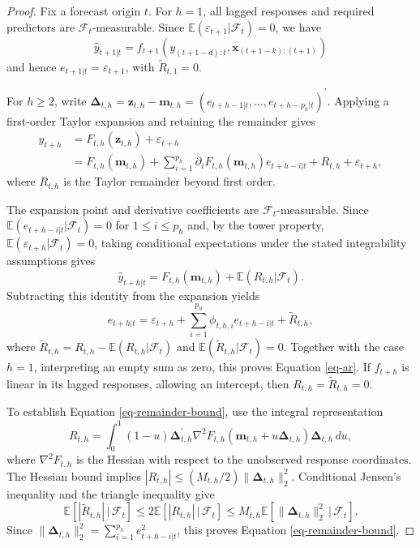 \documentclass[
  american,
  12pt]{article}
\theoremstyle{plain}
\theoremstyle{plain}
\theoremstyle{remark}
\begin{document}
\begin{proof}
Fix a forecast origin \(t\). For \(h=1\), all lagged responses and
required predictors are \(\mathcal F_t\)-measurable. Since
\(\mathbb E(\varepsilon_{t+1}|\mathcal F_t)=0\), we have \[
\hat y_{t+1|t}=f_{t+1}(y_{(t+1-d):t},\bm x_{(t+1-k):(t+1)})
\] and hence \(e_{t+1|t}=\varepsilon_{t+1}\), with
\(\widetilde R_{t,1}=0\).

For \(h\geq2\), write
\(\bm\Delta_{t,h}=\bm z_{t,h}-\bm m_{t,h}=(e_{t+h-1|t},\dots,e_{t+h-p_h|t})^{\prime}\).
Applying a first-order Taylor expansion and retaining the remainder
gives \begin{align*}
y_{t+h}
&=F_{t,h}(\bm z_{t,h})+\varepsilon_{t+h}\\
&=F_{t,h}(\bm m_{t,h})
+\sum_{i=1}^{p_h}\partial_iF_{t,h}(\bm m_{t,h})e_{t+h-i|t}
+R_{t,h}+\varepsilon_{t+h},
\end{align*} where \(R_{t,h}\) is the Taylor remainder beyond first
order.

The expansion point and derivative coefficients are
\(\mathcal F_t\)-measurable. Since
\(\mathbb E(e_{t+h-i|t}|\mathcal F_t)=0\) for \(1\leq i\leq p_h\) and,
by the tower property, \(\mathbb E(\varepsilon_{t+h}|\mathcal F_t)=0\),
taking conditional expectations under the stated integrability
assumptions gives \[
\hat y_{t+h|t}=F_{t,h}(\bm m_{t,h})+\mathbb E(R_{t,h}|\mathcal F_t).
\] Subtracting this identity from the expansion yields \[
e_{t+h|t}=\varepsilon_{t+h}+\sum_{i=1}^{p_h}\phi_{t,h,i}e_{t+h-i|t}+\widetilde R_{t,h},
\] where \(\widetilde R_{t,h}=R_{t,h}-\mathbb E(R_{t,h}|\mathcal F_t)\)
and \(\mathbb E(\widetilde R_{t,h}|\mathcal F_t)=0\). Together with the
case \(h=1\), interpreting an empty sum as zero, this proves Equation
\eqref{eq-ar}. If \(f_{t+h}\) is linear in its lagged responses,
allowing an intercept, then \(R_{t,h}=\widetilde R_{t,h}=0\).

To establish Equation \eqref{eq-remainder-bound}, use the integral
representation \[
R_{t,h}=\int_0^1(1-u)\bm\Delta_{t,h}^{\prime}
\nabla^2 F_{t,h}(\bm m_{t,h}+u\bm\Delta_{t,h})\bm\Delta_{t,h}\,du,
\] where \(\nabla^2F_{t,h}\) is the Hessian with respect to the
unobserved response coordinates. The Hessian bound implies
\(|R_{t,h}|\leq(M_{t,h}/2)\|\bm\Delta_{t,h}\|_2^2\). Conditional
Jensen's inequality and the triangle inequality give \[
\mathbb E\!\left[|\widetilde R_{t,h}|\,|\,\mathcal F_t\right]
\leq2\mathbb E\!\left[|R_{t,h}|\,|\,\mathcal F_t\right]
\leq M_{t,h}\mathbb E\!\left[\|\bm\Delta_{t,h}\|_2^2\,|\,\mathcal F_t\right].
\] Since \(\|\bm\Delta_{t,h}\|_2^2=\sum_{i=1}^{p_h}e_{t+h-i|t}^2\), this
proves Equation \eqref{eq-remainder-bound}.
\end{proof}
\end{document}
